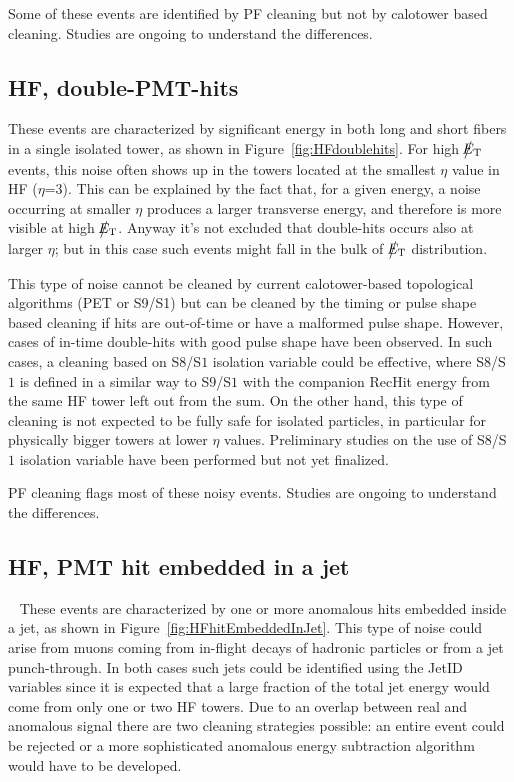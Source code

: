 Some of these events are identified by PF cleaning but not by calotower based cleaning.
Studies are ongoing to understand the differences.

\subsection{HF, double-PMT-hits}
These events are characterized by significant energy in both long and short fibers in a single
isolated tower, as shown in Figure~\ref{fig:HFdoublehits}. For high $\big\slash\hspace{-1.6ex}{E_\text{T}}$ events, 
this noise often shows up in the towers located at the smallest $\eta$ 
value in HF ($\eta$=3). This can be explained by the fact that, for a given energy, 
a noise occurring at smaller $\eta$ produces a larger transverse energy, and therefore is more visible at high $\big\slash\hspace{-1.6ex}{E_\text{T}}$.
Anyway it's not excluded that double-hits occurs also at larger $\eta$; but in this case such events might 
fall in the bulk of $\big\slash\hspace{-1.6ex}{E_\text{T}}$ distribution.

This type of noise cannot be cleaned by current calotower-based topological algorithms (PET or S9/S1) but can
be cleaned by the timing or pulse shape based cleaning if hits are out-of-time or have a malformed pulse shape.
However, cases of in-time double-hits with good pulse shape have been observed. In such cases, a cleaning based on
S$8$/S$1$ isolation variable could be effective, where S$8$/S$1$ is defined in a similar way to S$9$/S$1$
with the companion RecHit energy from the same HF tower left out from the sum. 
On the other hand, this type of cleaning is not expected to be fully safe for isolated particles, 
in particular for physically bigger towers at lower $\eta$ values. 
Preliminary studies on the use of S$8$/S$1$ isolation variable have been performed but not yet finalized. 

PF cleaning flags most of these noisy events. Studies are ongoing to understand the differences.

\subsection{HF, PMT hit embedded in a jet} ~\label{sec:HFHitEmbeddedInJet}
These events are characterized by one or more anomalous hits embedded inside a jet, as shown in 
Figure~\ref{fig:HFhitEmbeddedInJet}. This type of noise could arise from muons coming from 
in-flight decays of hadronic particles or from a jet punch-through. In both cases
such jets could be identified using the JetID variables since it is expected that a large fraction of the
total jet energy would come from only one or two HF towers. Due to an overlap between real and anomalous signal there are
two cleaning strategies possible: an entire event could be rejected or a more sophisticated anomalous energy
subtraction algorithm would have to be developed.

